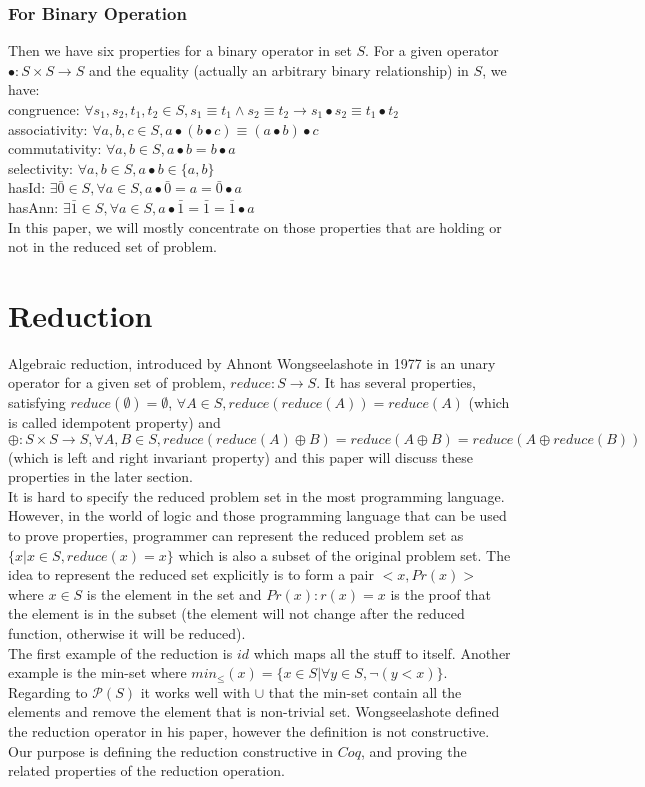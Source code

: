 \documentclass[a4paper,12pt,twoside,openright]{report}
\begin{document}
\subsubsection{For Binary Operation}
Then we have six properties for a binary operator in set $S$. For a given operator $\bullet: S\times S \rightarrow S$ and the equality (actually an arbitrary binary relationship) in $S$, we have:\\
congruence: $\forall s_1,s_2,t_1,t_2 \in S, s_1 \equiv t_1 \wedge s_2 \equiv t_2 \rightarrow s_1 \bullet s_2 \equiv t_1 \bullet t_2$\\
associativity: $\forall a,b,c \in S, a \bullet (b \bullet c) \equiv (a \bullet b) \bullet c$\\
commutativity: $\forall a,b\in S, a \bullet b = b \bullet a$\\
selectivity: $\forall a,b\in S, a \bullet b \in \{a,b\}$\\
hasId: $\exists \bar0 \in S, \forall a \in S, a \bullet \bar0 = a = \bar0 \bullet a$\\
hasAnn: $\exists \bar1 \in S, \forall a \in S, a \bullet \bar1 = \bar1 = \bar1 \bullet a$\\
In this paper, we will mostly concentrate on those properties that are holding or not in the reduced set of problem. 

\section{Reduction}
Algebraic reduction, introduced by Ahnont Wongseelashote in 1977\cite{WONGSEELASHOTE197955} is an unary operator for a given set of problem, $reduce : S \longrightarrow S$. It has several properties, satisfying $reduce(\emptyset) = \emptyset$, $\forall A \in S, reduce(reduce(A)) = reduce(A)$ (which is called idempotent property) and $\oplus : S \times S \rightarrow S, \forall A,B \in S, reduce(reduce(A)\oplus B) = reduce(A\oplus B) = reduce(A\oplus reduce(B))$ (which is left and right invariant property) and this paper will discuss these properties in the later section.\\ 
It is hard to specify the reduced problem set in the most programming language. However, in the world of logic and those programming language that can be used to prove properties, programmer can represent the reduced problem set as $\{x | x \in S, reduce(x) = x\}$ which is also a subset of the original problem set. The idea to represent the reduced set explicitly is to form a pair $<x,Pr(x)>$ where $x \in S$ is the element in the set and $Pr(x) : r(x) = x$ is the proof that the element is in the subset (the element will not change after the reduced function, otherwise it will be reduced). \\
The first example of the reduction is $id$ which maps all the stuff to itself. Another example is the min-set where $min_\leq(x) = \{x \in S | \forall y \in S, \neg(y < x)\}$. Regarding to $\mathcal{P}(S)$ it works well with $\cup$ that the min-set contain all the elements and remove the element that is non-trivial set. Wongseelashote defined the reduction operator in his paper, however the definition is not constructive. Our purpose is defining the reduction constructive in $Coq$, and proving the related properties of the reduction operation.
\end{document}
